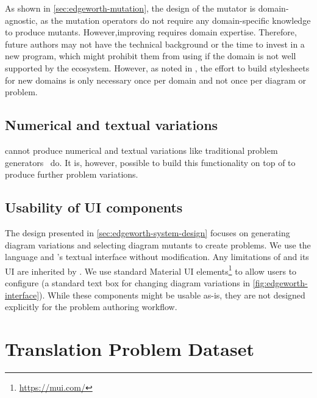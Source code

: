 As shown in \cref{sec:edgeworth-mutation}, the design of the \Edgeworth mutator is domain-agnostic, as the mutation operators do not require any domain-specific knowledge to produce mutants. However,improving \Style requires domain expertise. Therefore, future \Edgeworth authors may not have the technical background or the time to invest in a new \Style program, which might prohibit them from using \Edgeworth if the domain is not well supported by the \Penrose ecosystem. However, as noted in \citet[Section~5]{penrose}, the effort to build \Penrose stylesheets for new domains is only necessary once per domain and not once per diagram or problem.

\subsection{Numerical and textual variations}

\Edgeworth cannot produce numerical and textual variations like traditional problem generators~\cite{CTAT, ASSISTment} do. It is, however, possible to build this functionality on top of \Edgeworth to produce further problem variations. 


\subsection{Usability of UI components}

The design presented in \cref{sec:edgeworth-system-design} focuses on generating diagram variations and selecting diagram mutants to create problems. We use the \Substance language and \Penrose's textual interface without modification. Any limitations of \Substance and its UI are inherited by \Edgeworth. We use standard Material UI elements\footnote{\url{https://mui.com/}} to allow users to configure \Edgeworth (\eg a standard text box for changing diagram variations in \cref{fig:edgeworth-interface}). While these components might be usable as-is, they are not designed explicitly for the problem authoring workflow. 


\section{Translation Problem Dataset}
\label{sec:edgeworth-case-studies}

